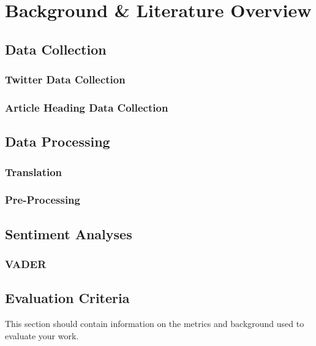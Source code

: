 \chapter{Background \& Literature Overview}


\section{Data Collection}
\blindtext
\subsection{Twitter Data Collection}
\blindtext
\subsection{Article Heading Data Collection}
\blindtext
{}

\section{Data Processing}
\blindtext
\subsection{Translation}
\blindtext
\subsection{Pre-Processing}
\blindtext
{}


\section{Sentiment Analyses}
\blindtext
\subsection{\ac{VADER}}
\blindtext
{}

\section{Evaluation Criteria}
This section should contain information on the metrics and background used to evaluate your work.

